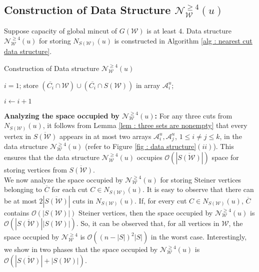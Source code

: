 \documentclass[letterpaper,11pt]{article}
\begin{document}
\subsection*{Construction of Data Structure ${\mathcal N}^{\ge 4}_{\mathcal W}(u)$}
Suppose capacity of global mincut of $G({\mathcal W})$ is at least $4$. Data structure ${\mathcal N}^{\ge 4}_{\mathcal W}(u)$ for storing $N_{S({\mathcal W})}(u)$ is constructed in Algorithm \ref{alg : nearest cut data structure}. 
\begin{algorithm}[H]
\caption{Construction of Data structure ${\mathcal N}^{\ge 4}_{\mathcal W}(u)$}
\label{alg : nearest cut data structure}
\begin{algorithmic}[1]
    \State $i=1$;
          \State store $(\overline{C_i}\cap {\mathcal W})\cup (\overline{C_i}\cap S({\mathcal W}))$ in array ${\mathcal A}_i^u$; 

\State $i\gets i+1$
    \EndFor
\EndProcedure
\end{algorithmic}
\end{algorithm}
\noindent
\textbf{Analyzing the space occupied by ${\mathcal N}^{\ge 4}_{\mathcal W}(u)$:} 
For any three cuts from $N_{S({\mathcal W})}(u)$, it follows from Lemma \ref{lem : three sets are nonempty} that 
every vertex in $\overline{S({\mathcal W})}$ appears in at most two arrays ${\mathcal A}_i^u, {\mathcal A}_j^u$, $1\le i\ne j\le k$, in the data structure ${\mathcal N}^{\ge 4}_{\mathcal W}(u)$ (refer to Figure \ref{fig : data structure}$(ii)$). This ensures that the data structure ${\mathcal N}^{\ge 4}_{\mathcal W}(u)$ occupies ${\mathcal O}(|\overline{S({\mathcal W})}|)$ space for storing vertices from $\overline{S({\mathcal W})}$.\\ 


We now analyze the space occupied by ${\mathcal N}_{\mathcal W}^{\ge 4}(u)$ for storing Steiner vertices belonging to $\overline{C}$ for each cut $C\in N_{S({\mathcal W})}(u)$. It is easy to observe that there can be at most $2|\overline{S({\mathcal W})}|$ cuts in $N_{S({\mathcal W})}(u)$. If, for every cut $C\in N_{S({\mathcal W})}(u)$, $\overline{C}$ contains ${\mathcal O}(|S({\mathcal W})|)$ Steiner vertices, then the space occupied by ${\mathcal N}_{\mathcal W}^{\ge 4}(u)$ is ${\mathcal O}(|\overline{S({\mathcal W})}||S({\mathcal W})|)$. So, it can be observed that, for all vertices in ${\mathcal W}$, the space occupied by ${\mathcal N}_{\mathcal W}^{\ge 4}$ is ${\mathcal O}((n-|S|)^2|S|)$ in the worst case. 
Interestingly, we show in two phases that the space occupied by ${\mathcal N}_{\mathcal W}^{\ge 4}(u)$ is ${\mathcal O}(|\overline{S({\mathcal W})}|+|S({\mathcal W})|)$.
\end{document}
